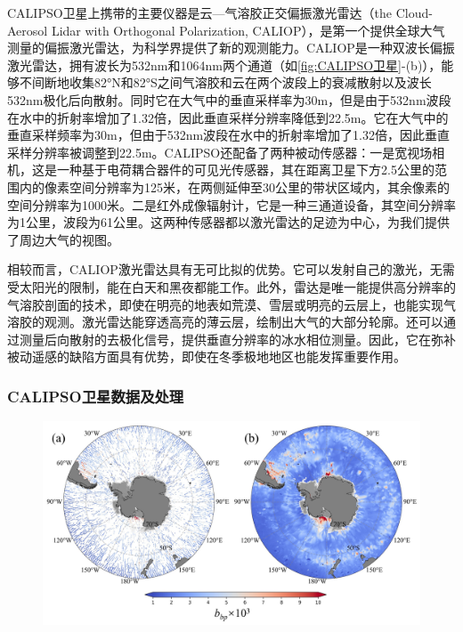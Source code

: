CALIPSO卫星上携带的主要仪器是云—气溶胶正交偏振激光雷达（the Cloud-Aerosol Lidar with Orthogonal Polarization, CALIOP），是第一个提供全球大气测量的偏振激光雷达，为科学界提供了新的观测能力。CALIOP是一种双波长偏振激光雷达，拥有波长为532nm和1064nm两个通道（如\autoref{fig:CALIPSO卫星}-(b)），能够不间断地收集82°N和82°S之间气溶胶和云在两个波段上的衰减散射以及波长532nm极化后向散射。\cite{CALIPSO_2009}同时它在大气中的垂直采样率为30m，但是由于532nm波段在水中的折射率增加了1.32倍，因此垂直采样分辨率降低到22.5m。它在大气中的垂直采样频率为30m，但由于532nm波段在水中的折射率增加了1.32倍，因此垂直采样分辨率被调整到22.5m。CALIPSO还配备了两种被动传感器：一是宽视场相机，这是一种基于电荷耦合器件的可见光传感器，其在距离卫星下方2.5公里的范围内的像素空间分辨率为125米，在两侧延伸至30公里的带状区域内，其余像素的空间分辨率为1000米。二是红外成像辐射计，它是一种三通道设备，其空间分辨率为1公里，波段为61公里。这两种传感器都以激光雷达的足迹为中心，为我们提供了周边大气的视图。

相较而言，CALIOP激光雷达具有无可比拟的优势。它可以发射自己的激光，无需受太阳光的限制，能在白天和黑夜都能工作。此外，雷达是唯一能提供高分辨率的气溶胶剖面的技术，即使在明亮的地表如荒漠、雪层或明亮的云层上，也能实现气溶胶的观测。激光雷达能穿透高亮的薄云层，绘制出大气的大部分轮廓。还可以通过测量后向散射的去极化信号，提供垂直分辨率的冰水相位测量。\cite{CALIPSO_2009,winker2003accounting}因此，它在弥补被动遥感的缺陷方面具有优势，即使在冬季极地地区也能发挥重要作用。

\subsubsection{CALIPSO卫星数据及处理}
\begin{figure}[htbp]
    \centering
    \includegraphics[width=\linewidth]{figure/第二章用图/图2-bbp处理.jpg}
\end{figure}


